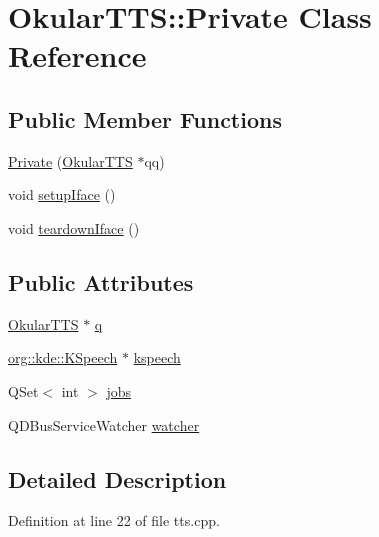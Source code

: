 \hypertarget{classOkularTTS_1_1Private}{\section{Okular\+T\+T\+S\+:\+:Private Class Reference}
\label{classOkularTTS_1_1Private}
}
\subsection*{Public Member Functions}
\begin{DoxyCompactItemize}
\item 
\hyperlink{classOkularTTS_1_1Private_a274064058c052cc98923875ae56dc1c9}{Private} (\hyperlink{classOkularTTS}{Okular\+T\+T\+S} $\ast$qq)
\item 
void \hyperlink{classOkularTTS_1_1Private_a5e8372e99b2e3fc4a7f8458ac722df24}{setup\+Iface} ()
\item 
void \hyperlink{classOkularTTS_1_1Private_a7cedd045a18164ae6d61e40a6bb2b28e}{teardown\+Iface} ()
\end{DoxyCompactItemize}
\subsection*{Public Attributes}
\begin{DoxyCompactItemize}
\item 
\hyperlink{classOkularTTS}{Okular\+T\+T\+S} $\ast$ \hyperlink{classOkularTTS_1_1Private_afd9d0ce678e2e78ac68b418980e584fa}{q}
\item 
\hyperlink{namespaceorg_1_1kde_a660da8eeb8f371be9650137642072d62}{org\+::kde\+::\+K\+Speech} $\ast$ \hyperlink{classOkularTTS_1_1Private_a4879c95e72003878001912f8f9410403}{kspeech}
\item 
Q\+Set$<$ int $>$ \hyperlink{classOkularTTS_1_1Private_aa811af4dafacdfd951476c1359533466}{jobs}
\item 
Q\+D\+Bus\+Service\+Watcher \hyperlink{classOkularTTS_1_1Private_a7d356c1fac80113054138b07a96a6c74}{watcher}
\end{DoxyCompactItemize}


\subsection{Detailed Description}


Definition at line 22 of file tts.\+cpp.



